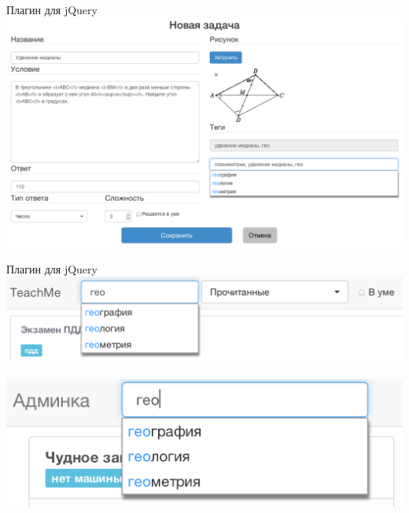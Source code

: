 \documentclass[fullscreen, unicode, bookmarks = false]{beamer}
\begin{document}
    \begin{frame}{Плагин для jQuery}
        \includegraphics[scale=0.27]{plugin1.png}
    \end{frame}
    \begin{frame}{Плагин для jQuery}
        \includegraphics[scale=0.23]{plugin21.png}\\
        ~\\
        \includegraphics[scale=0.23]{plugin22.png}
    \end{frame}
     
    
\end{document}
